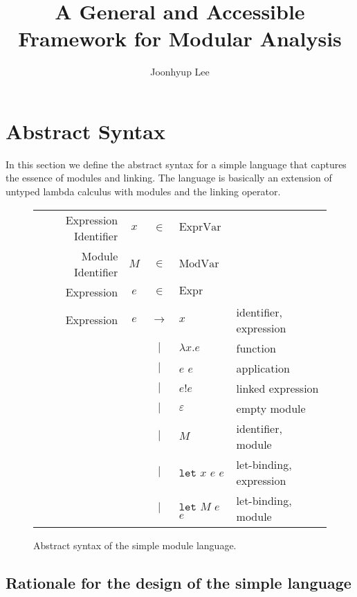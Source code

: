 \documentclass[acmsmall,screen]{acmart}
\title{A General and Accessible Framework for Modular Analysis}
\author{Joonhyup Lee}
\theoremstyle{definition}
\newcommand*{\vbar}{|}
\newcommand*{\Expr}{\text{Expr}}
\newcommand*{\ExprVar}{\text{ExprVar}}
\newcommand*{\ModVar}{\text{ModVar}}
\newcommand*{\link}[2]{{#1}\mathtt{!}{#2}}
\newcommand*{\Let}{\mathtt{let}}
\begin{document}
\maketitle

\section{Abstract Syntax}

In this section we define the abstract syntax for a simple language that captures the essence of modules and linking.
The language is basically an extension of untyped lambda calculus with modules and the linking operator.
\begin{figure}[htb]
  \centering
  \footnotesize
  \begin{tabular}{rccll}
    Expression Identifier & $x$ & $\in$         & $\ExprVar$                                   \\
    Module Identifier     & $M$ & $\in$         & $\ModVar$                                    \\
    Expression            & $e$ & $\in$         & $\Expr$                                      \\
    Expression            & $e$ & $\rightarrow$ & $x$                & identifier, expression  \\
                          &     & $\vbar$       & $\lambda x.e$      & function                \\
                          &     & $\vbar$       & $e$ $e$            & application             \\
                          &     & $\vbar$       & $\link{e}{e}$      & linked expression       \\
                          &     & $\vbar$       & $\varepsilon$      & empty module            \\
                          &     & $\vbar$       & $M$                & identifier, module      \\
                          &     & $\vbar$       & $\Let$ $x$ $e$ $e$ & let-binding, expression \\
                          &     & $\vbar$       & $\Let$ $M$ $e$ $e$ & let-binding, module     \\
  \end{tabular}
  \caption{Abstract syntax of the simple module language.}
\end{figure}
\subsection{Rationale for the design of the simple language}
\end{document}
